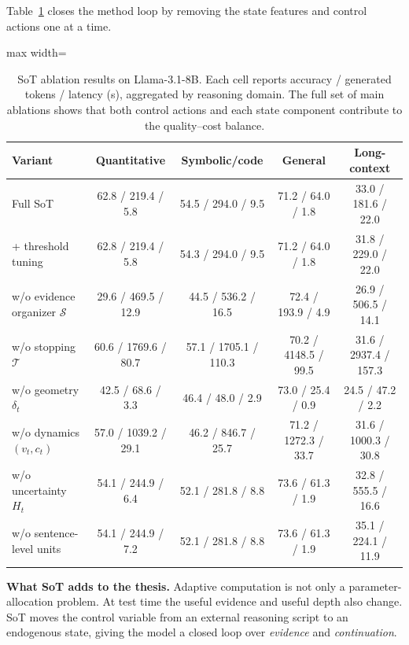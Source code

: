 \documentclass[12pt,a4paper]{article}
\newcommand{\method}[1]{{\sffamily\bfseries\color{MethodBlue}#1}}
\newcommand{\XDB}{\method{XDomainBench}}
\newcommand{\SubspacePath}{\method{SubspacePath Pruner}}
\newcommand{\SoT}{\method{SoT}}
\newcommand{\LoTR}{\method{LoTR}}
\newcommand{\EtoE}{\method{E2E-Merge}}
\def\method#1{#1}\def\XDB{XDomainBench}\def\SubspacePath{SubspacePath Pruner}%
\def\SoT{SoT}\def\LoTR{LoTR}\def\EtoE{E2E-Merge}%
\begin{document}
Table~\ref{tab:sot-ablation} closes the method loop by removing the state features and control actions one at a time.
\begin{table}[tbp]
\centering\singlespacing\scriptsize
\caption{\SoT{} ablation results on Llama-3.1-8B. Each cell reports accuracy / generated tokens / latency (s), aggregated by reasoning domain. The full set of main ablations shows that both control actions and each state component contribute to the quality--cost balance.}
\label{tab:sot-ablation}
\setlength{\tabcolsep}{2.5pt}
\begin{adjustbox}{max width=\textwidth}
\begin{tabular}{lcccc}
\toprule
\textbf{Variant} & \textbf{Quantitative} & \textbf{Symbolic/code} & \textbf{General} & \textbf{Long-context}\\
\midrule
Full \SoT{} & 62.8 / 219.4 / 5.8 & 54.5 / 294.0 / 9.5 & 71.2 / 64.0 / 1.8 & 33.0 / 181.6 / 22.0\\
+ threshold tuning & 62.8 / 219.4 / 5.8 & 54.3 / 294.0 / 9.5 & 71.2 / 64.0 / 1.8 & 31.8 / 229.0 / 22.0\\
\midrule
w/o evidence organizer $\mathcal S$ & 29.6 / 469.5 / 12.9 & 44.5 / 536.2 / 16.5 & 72.4 / 193.9 / 4.9 & 26.9 / 506.5 / 14.1\\
w/o stopping $\mathcal T$ & 60.6 / 1769.6 / 80.7 & 57.1 / 1705.1 / 110.3 & 70.2 / 4148.5 / 99.5 & 31.6 / 2937.4 / 157.3\\
w/o geometry $\delta_t$ & 42.5 / 68.6 / 3.3 & 46.4 / 48.0 / 2.9 & 73.0 / 25.4 / 0.9 & 24.5 / 47.2 / 2.2\\
w/o dynamics $(v_t,c_t)$ & 57.0 / 1039.2 / 29.1 & 46.2 / 846.7 / 25.7 & 71.2 / 1272.3 / 33.7 & 31.6 / 1000.3 / 30.8\\
w/o uncertainty $H_t$ & 54.1 / 244.9 / 6.4 & 52.1 / 281.8 / 8.8 & 73.6 / 61.3 / 1.9 & 32.8 / 555.5 / 16.6\\
w/o sentence-level units & 54.1 / 244.9 / 7.2 & 52.1 / 281.8 / 8.8 & 73.6 / 61.3 / 1.9 & 35.1 / 224.1 / 11.9\\
\bottomrule
\end{tabular}
\end{adjustbox}
\end{table}

\begin{insightbox}
\textbf{What \SoT{} adds to the thesis.} Adaptive computation is not only a parameter-allocation problem. At test time the useful evidence and useful depth also change. \SoT{} moves the control variable from an external reasoning script to an endogenous state, giving the model a closed loop over \emph{evidence} and \emph{continuation}.
\end{insightbox}
\end{document}
